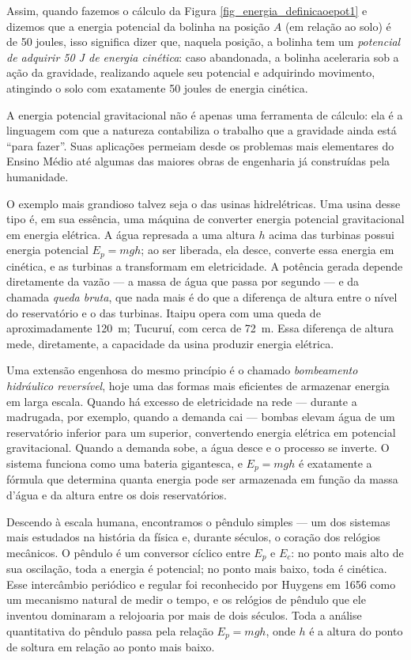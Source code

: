 Assim, quando fazemos o cálculo da Figura \ref{fig_energia_definicaoepot1} e dizemos que a energia potencial da bolinha na posição $A$ (em relação ao solo) é de 50 joules, isso significa dizer que, naquela posição, a bolinha tem um \emph{potencial de adquirir 50 J de energia cinética}: caso abandonada, a bolinha aceleraria sob a ação da gravidade, realizando aquele seu potencial e adquirindo movimento, atingindo o solo com exatamente 50 joules de energia cinética.




A energia potencial gravitacional não é apenas uma ferramenta de
cálculo: ela é a linguagem com que a natureza contabiliza o trabalho
que a gravidade ainda está ``para fazer''. Suas aplicações permeiam
desde os problemas mais elementares do Ensino Médio até algumas das
maiores obras de engenharia já construídas pela humanidade.

O exemplo mais grandioso talvez seja o das usinas hidrelétricas. Uma
usina desse tipo é, em sua essência, uma máquina de converter energia
potencial gravitacional em energia elétrica. A água represada a uma
altura $h$ acima das turbinas possui energia potencial $E_p = mgh$;
ao ser liberada, ela desce, converte essa energia em cinética, e as
turbinas a transformam em eletricidade. A potência gerada depende
diretamente da vazão --- a massa de água que passa por segundo --- e
da chamada \emph{queda bruta}, que nada mais é do que a diferença de
altura entre o nível do reservatório e o das turbinas. Itaipu opera
com uma queda de aproximadamente \SI{120}{m}; Tucuruí, com cerca de
\SI{72}{m}. Essa diferença de altura mede, diretamente, a capacidade da usina produzir energia elétrica.

Uma extensão engenhosa do mesmo princípio é o chamado
\emph{bombeamento hidráulico reversível}, hoje uma das formas mais
eficientes de armazenar energia em larga escala. Quando há excesso
de eletricidade na rede --- durante a madrugada, por exemplo, quando
a demanda cai --- bombas elevam água de um reservatório inferior para
um superior, convertendo energia elétrica em potencial gravitacional.
Quando a demanda sobe, a água desce e o processo se inverte. O sistema
funciona como uma bateria gigantesca, e $E_p = mgh$ é exatamente a
fórmula que determina quanta energia pode ser armazenada em função da
massa d'água e da altura entre os dois reservatórios.

Descendo à escala humana, encontramos o pêndulo simples --- um dos
sistemas mais estudados na história da física e, durante séculos,
o coração dos relógios mecânicos. O pêndulo é um conversor cíclico
entre $E_p$ e $E_c$: no ponto mais alto de sua oscilação, toda a energia
é potencial; no ponto mais baixo, toda é cinética. Esse intercâmbio
periódico e regular foi reconhecido por Huygens em 1656 como um
mecanismo natural de medir o tempo, e os relógios de pêndulo que ele
inventou dominaram a relojoaria por mais de dois séculos. Toda a
análise quantitativa do pêndulo passa pela relação $E_p = mgh$, onde
$h$ é a altura do ponto de soltura em relação ao ponto mais baixo.

